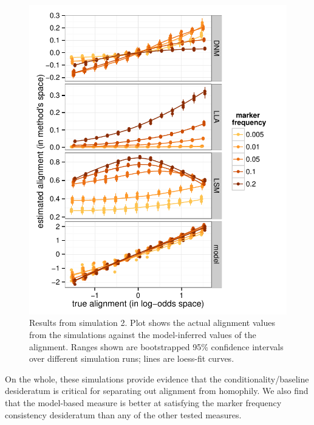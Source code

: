 \documentclass{acm_proc_article-sp}
\begin{document}
\begin{figure}[t]
\centering
\includegraphics[width=\columnwidth]{graphics/www2016_simulation2b_crossiter.pdf}
\caption{Results from simulation 2. Plot shows the actual alignment values from the simulations against the model-inferred values of the alignment. Ranges shown are bootstrapped 95\% confidence intervals over different simulation runs; lines are loess-fit curves.}\label{fig:sim2}
\end{figure}

On the whole, these simulations provide evidence that the conditionality/baseline desideratum is critical for separating out alignment from homophily.  We also find that the model-based measure is better at satisfying the marker frequency consistency desideratum than any of the other tested measures.


\end{document}
